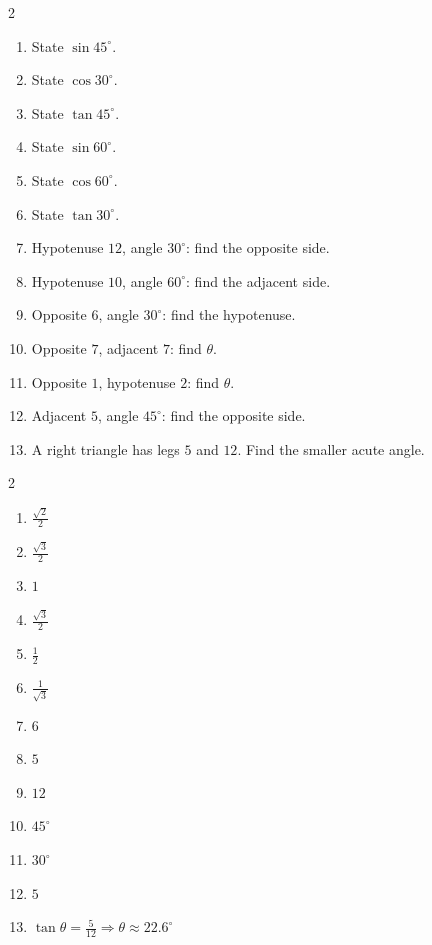 \documentclass[11pt]{article}
\begin{document}
\begin{recapbox}
\begin{multicols}{2}
\small
\begin{enumerate}[leftmargin=*,itemsep=3pt]
  \item State $\sin45^\circ$.
  \item State $\cos30^\circ$.
  \item State $\tan45^\circ$.
  \item State $\sin60^\circ$.
  \item State $\cos60^\circ$.
  \item State $\tan30^\circ$.
  \item Hypotenuse $12$, angle $30^\circ$: find the opposite side.
  \item Hypotenuse $10$, angle $60^\circ$: find the adjacent side.
  \item Opposite $6$, angle $30^\circ$: find the hypotenuse.
  \item Opposite $7$, adjacent $7$: find $\theta$.
  \item Opposite $1$, hypotenuse $2$: find $\theta$.
  \item Adjacent $5$, angle $45^\circ$: find the opposite side.
  \item A right triangle has legs $5$ and $12$. Find the smaller acute angle.
\end{enumerate}
\end{multicols}
\end{recapbox}

\begin{keybox}
\begin{multicols}{2}
\small
\begin{enumerate}[leftmargin=*,itemsep=3pt]
  \item $\tfrac{\sqrt2}{2}$
  \item $\tfrac{\sqrt3}{2}$
  \item $1$
  \item $\tfrac{\sqrt3}{2}$
  \item $\tfrac12$
  \item $\tfrac{1}{\sqrt3}$
  \item $6$
  \item $5$
  \item $12$
  \item $45^\circ$
  \item $30^\circ$
  \item $5$
  \item $\tan\theta=\tfrac{5}{12}\Rightarrow\theta\approx22.6^\circ$
\end{enumerate}
\end{multicols}
\end{keybox}
\end{document}
